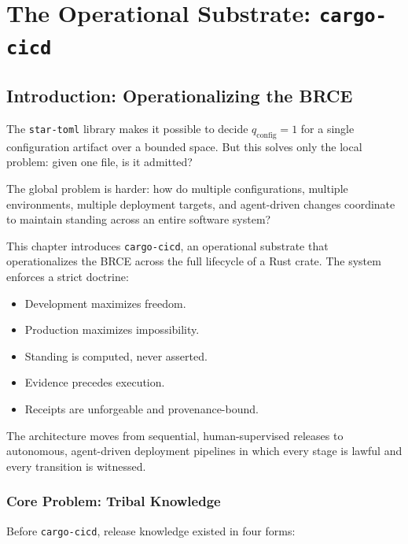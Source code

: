 
\chapter{The Operational Substrate: \texttt{cargo-cicd}}
\label{ch:cargo-cicd}

\section{Introduction: Operationalizing the BRCE}

The \texttt{star-toml} library makes it possible to decide $q_{\mathrm{config}} = 1$ for a single configuration artifact over a bounded space. But this solves only the local problem: given one file, is it admitted?

The global problem is harder: how do multiple configurations, multiple environments, multiple deployment targets, and agent-driven changes coordinate to maintain standing across an entire software system?

This chapter introduces \texttt{cargo-cicd}, an operational substrate that operationalizes the BRCE across the full lifecycle of a Rust crate. The system enforces a strict doctrine:
\begin{itemize}
  \item Development maximizes freedom.
  \item Production maximizes impossibility.
  \item Standing is computed, never asserted.
  \item Evidence precedes execution.
  \item Receipts are unforgeable and provenance-bound.
\end{itemize}

The architecture moves from sequential, human-supervised releases to autonomous, agent-driven deployment pipelines in which every stage is lawful and every transition is witnessed.

\subsection{Core Problem: Tribal Knowledge}

Before \texttt{cargo-cicd}, release knowledge existed in four forms:

